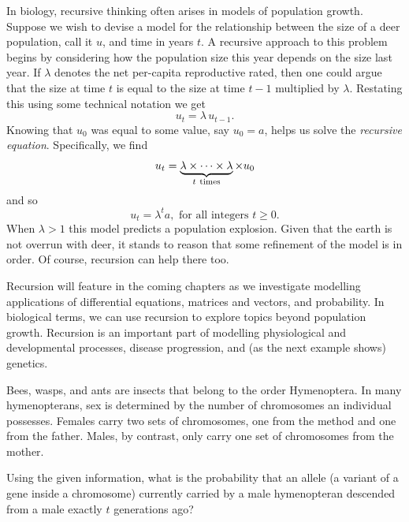 \documentclass[../book.tex]{subfiles}
\begin{document}
In biology, recursive thinking often arises in models of population growth. Suppose we wish to devise a model for the relationship between the size of a deer population, call it \(u\), and time in years \(t\). A recursive approach to this problem begins by considering how the population size this year depends on the size last year. If \(\lambda\) denotes the net per-capita reproductive rated, then one could argue that
the size at time \(t\) is equal to the size at time \(t-1\) multiplied by \(\lambda\). Restating this using some technical notation we get
\begin{equation}\label{eq:models-9}
u_{t} = \lambda \, u_{t-1}.
\end{equation}
Knowing that \(u_0\) was equal to some value, say \(u_0 =a\), helps us solve the \emph{recursive equation}. Specifically, we find
\begin{equation}\label{eq:models-10}
u_{t} = \underbrace{\lambda \times \cdots \times \lambda}_{t\ {\rm times}} \times u_0
\end{equation}
and so
\begin{equation}\label{eq:models-11}
u_{t} = \lambda^{t} a, \text{ for all integers } t \ge 0.
\end{equation}
When \(\lambda >1\) this model predicts a population explosion. Given that the earth is not overrun with deer, it stands to reason that some refinement of the model is in order. Of course, recursion can help there too.

Recursion will feature in the coming chapters as we investigate modelling applications of differential equations, matrices and vectors, and probability. In biological terms, we can use recursion to explore topics beyond population growth. Recursion is an important part of modelling physiological and developmental processes, disease progression, and (as the next example shows) genetics.

\begin{example} \label{eg:recursion-alles}
Bees, wasps, and ants are insects that belong to the order Hymenoptera. In many hymenopterans, sex is determined by the number of chromosomes an individual possesses. Females carry two sets of chromosomes, one from the method and one from the father.  Males, by contrast, only carry one set of chromosomes from the mother.

Using the given information, what is the probability that an allele (a variant of a gene inside a chromosome) currently carried by a male hymenopteran descended from a male exactly \(t\) generations ago?
\end{example}
\end{document}
